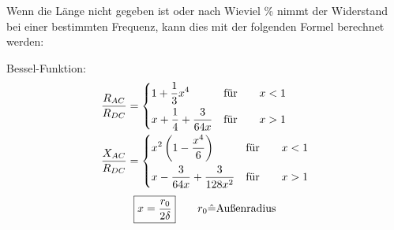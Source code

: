 Wenn die Länge nicht gegeben ist oder nach Wieviel \% nimmt der Widerstand bei
einer bestimmten Frequenz, kann dies mit der folgenden Formel berechnet werden:

\begin{description}
    \item Bessel-Funktion:
        \begin{align*}
            \frac{R_{AC}}{R_{DC}} & =
            \begin{dcases}
                1 + \frac{1}{3}x^4              & \text{für} \qquad x < 1 \\
                x + \frac{1}{4} + \frac{3}{64x} & \text{für} \qquad x > 1 \\
            \end{dcases} \\
            \frac{X_{AC}}{R_{DC}} & =
            \begin{dcases}
                x^2\left( 1-\frac{x^4}{6} \right)   & \text{für} \qquad x < 1 \\
                x- \frac{3}{64x} + \frac{3}{128x^2} & \text{für} \qquad x > 1 \\
            \end{dcases}
        \end{align*}
        \[
            \boxed{x=\frac{r_0}{2\delta}} \qquad r_0 \hat{=} \textnormal{Außenradius}
        \]
\end{description}


